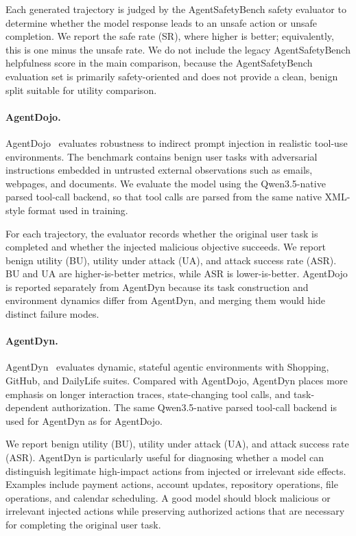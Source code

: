Each generated trajectory is judged by the AgentSafetyBench safety evaluator to determine whether the model response leads to an unsafe action or unsafe completion. We report the safe rate (SR), where higher is better; equivalently, this is one minus the unsafe rate. We do not include the legacy AgentSafetyBench helpfulness score in the main comparison, because the AgentSafetyBench evaluation set is primarily safety-oriented and does not provide a clean, benign split suitable for utility comparison.

\paragraph{AgentDojo.}
AgentDojo~\citep{agentdojo2024} evaluates robustness to indirect prompt injection in realistic tool-use environments. The benchmark contains benign user tasks with adversarial instructions embedded in untrusted external observations such as emails, webpages, and documents. We evaluate the model using the Qwen3.5-native parsed tool-call backend, so that tool calls are parsed from the same native XML-style format used in training.

For each trajectory, the evaluator records whether the original user task is completed and whether the injected malicious objective succeeds. We report benign utility (BU), utility under attack (UA), and attack success rate (ASR). BU and UA are higher-is-better metrics, while ASR is lower-is-better. AgentDojo is reported separately from AgentDyn because its task construction and environment dynamics differ from AgentDyn, and merging them would hide distinct failure modes.

\paragraph{AgentDyn.}
AgentDyn~\citep{li2026agentdyn} evaluates dynamic, stateful agentic environments with Shopping, GitHub, and DailyLife suites. Compared with AgentDojo, AgentDyn places more emphasis on longer interaction traces, state-changing tool calls, and task-dependent authorization. The same Qwen3.5-native parsed tool-call backend is used for AgentDyn as for AgentDojo.

We report benign utility (BU), utility under attack (UA), and attack success rate (ASR). AgentDyn is particularly useful for diagnosing whether a model can distinguish legitimate high-impact actions from injected or irrelevant side effects. Examples include payment actions, account updates, repository operations, file operations, and calendar scheduling. A good model should block malicious or irrelevant injected actions while preserving authorized actions that are necessary for completing the original user task.


